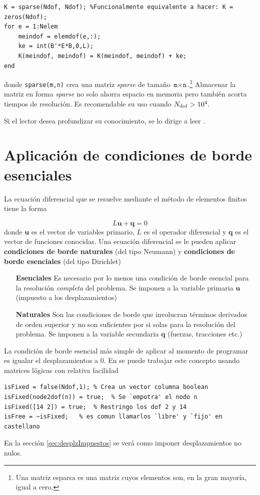 \begin{lstlisting}[caption = {Obtención generica de matriz de rigidez.}]
K = sparse(Ndof, Ndof); %Funcionalmente equivalente a hacer: K = zeros(Ndof);
for e = 1:Nelem
    meindof = elemdof(e,:);
    ke = int(B'*E*B,0,L);
    K(meindof, meindof) = K(meindof, meindof) + ke;
end
\end{lstlisting}

donde \texttt{sparse(m,n)} crea una matriz \textit{sparse} de tamaño $\texttt{m}\times\texttt{n}$.\footnote{Una matriz esparsa es una matriz cuyos elementos son, en la gran mayoría, igual a cero.} Almacenar la matriz en forma \textit{sparse} no solo ahorra espacio en memoria pero también acorta tiempos de resolución. Es recomendable su uso cuando $N_{\mathrm{dof}}>10^4$.

Si el lector desea profundizar su conocimiento, se lo dirige a leer \citet{chessa2002programing}.


\section{Aplicación de condiciones de borde esenciales} \label{sec:condBordeEsenciales}
La ecuación diferencial que se resuelve mediante el método de elementos finitos tiene la forma

\begin{equation}  \label{eq:condBordeGeneralizada}
L\mathbf{u}+\mathbf{q}=0
\end{equation}
donde $\mathbf{u}$ es el vector de variables primario, $L$ es el operador diferencial y $\mathbf{q}$ es el vector de funciones conocidas. Una ecuación diferencial se le pueden aplicar \textbf{condiciones de borde naturales} (del tipo Neumann) y \textbf{condiciones de borde esenciales} (del tipo Dirichlet) \citep{dixit2007finite}
\begin{enumerate}
	\item[\textbf{Esenciales}] Es necesario por lo menos una condición de borde esencial para la resolución \textit{completa} del problema. Se imponen a la variable primaria $\mathbf{u}$ (impuesto a los desplazamientos)
	\item[\textbf{Naturales}] Son las condiciones de borde que involucran términos derivados de orden superior y no son suficientes por si solas para la resolución del problema. Se imponen a la variable secundaria $\mathbf{q}$ (fuerzas, tracciones etc.)
\end{enumerate}

La condición de borde esencial más simple de aplicar al momento de programar es igualar el desplazamientos a 0. En \Matlab{} se puede trabajar este concepto usando matrices lógicas con relativa facilidad
\begin{lstlisting}[caption = {Aplicación de condiciones de borde esenciales.}]
isFixed = false(Ndof,1); % Crea un vector columna boolean
isFixed(node2dof(n)) = true;  % Se `empotra' el nodo n
isFixed([14 2]) = true;  % Restringo los dof 2 y 14
isFree = ~isFixed;   % es comun llamarlos `libre' y `fijo' en castellano
\end{lstlisting}
En la sección \ref{sec:desplzImpuestos} se verá como imponer desplazamientos no nulos.

